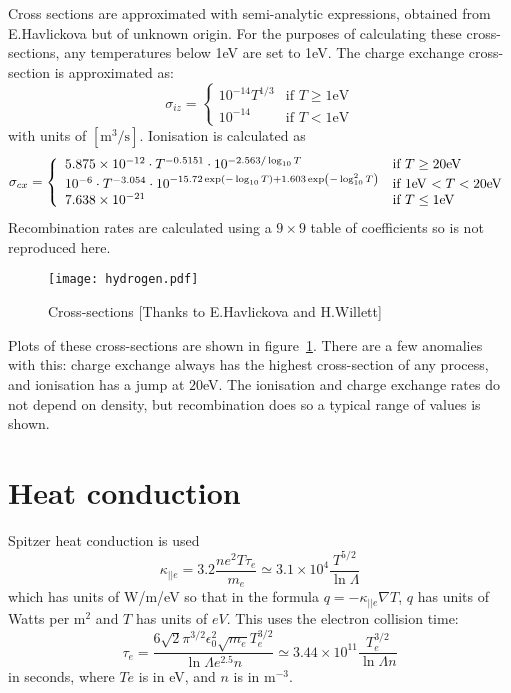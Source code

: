 \documentclass[12pt,a4paper]{article}
\begin{document}
Cross sections are approximated with semi-analytic expressions, obtained from E.Havlickova but of unknown origin. 
For the purposes of calculating these cross-sections, any temperatures below 1eV are set to 1eV. 
The charge exchange cross-section is approximated as:
\begin{equation}
  \sigma_{iz} = \left\{\begin{array}{ll}
10^{-14} T^{1/3} & \textrm{if $T \ge 1$eV} \\
10^{-14} & \textrm{if $T < 1$eV} \end{array}\right.
\end{equation}
with units of $[\textrm{m}^3/\textrm{s}]$. Ionisation is calculated as
\begin{equation}
\sigma_{cx} = \left\{\begin{array}{ll}
5.875\times 10^{-12}\cdot T^{-0.5151} \cdot 10^{-2.563/\log_{10}T} & \textrm{if $T \ge 20$eV} \\
10^{-6}\cdot T^{-3.054}\cdot 10^{-15.72\exp\left(-\log_{10}T\right) + 1.603\exp\left(-\log^2_{10}T\right)} & \textrm{if $1$eV $ < T < 20$eV} \\
7.638\times 10^{-21} & \textrm{if $T \le 1$eV}\end{array}\right.
\end{equation}
Recombination rates are calculated using a $9\times 9$ table of coefficients
so is not reproduced here.

\begin{figure}[h]
\centering
\texttt{[image: hydrogen.pdf]}
\caption{Cross-sections [Thanks to E.Havlickova and H.Willett]}
\label{fig:sigma}
\end{figure}
Plots of these cross-sections are shown in figure~\ref{fig:sigma}. There are a few anomalies with this: charge exchange always has the highest cross-section of any process, and ionisation has a jump at $20$eV. The ionisation and
charge exchange rates do not depend on density, but recombination does so a typical range of values is shown.

\section{Heat conduction}
\label{sec:heatconduction}

Spitzer heat conduction is used
\begin{equation}
\kappa_{||e} = 3.2\frac{ne^2T\tau_e}{m_e} \simeq 3.1\times 10^4 \frac{T^{5/2}}{\ln \Lambda}
\end{equation}
which has units of W/m/eV so that in the formula $q = -\kappa_{||e} \nabla T$, $q$ has units of Watts per m$^2$ and $T$ has units of
$eV$. This uses the electron collision time:
\begin{equation}
\tau_e = \frac{6\sqrt{2}\pi^{3/2}\epsilon_0^2\sqrt{m_e}T_e^{3/2}}{\ln \Lambda e^{2.5} n} \simeq 3.44\times 10^{11} \frac{T_e^{3/2}}{\ln \Lambda n}
\end{equation}
in seconds, where $Te$ is in eV, and $n$ is in m$^{-3}$.
\end{document}
